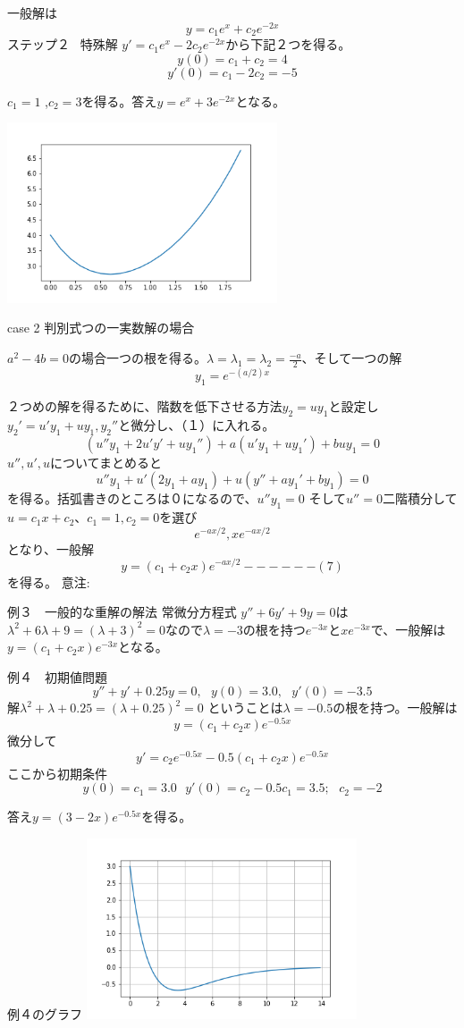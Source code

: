 \documentclass[uplatex]{jsarticle}
\begin{document}
  一般解は
$$ y = c_1{e}^{x} + c_2{e}^{-2x} $$
ステップ２ \ 特殊解 $y'=c_1{e}^{x} -2c_2{e}^{-2x}$から下記２つを得る。
$$ y(0) = c_1 +c_2 = 4$$
$$ y'(0) = c_1 -2c_2 = -5$$

$c_1=1$ ,$c_2=3$を得る。答え$y={e}^{x}+3{e}^{-2x}$となる。


\includegraphics[width=8cm]{../ipython/real.png}

 \LARGE case 2 判別式つの一実数解の場合
 \large

 
 $a^2-4b=0$の場合一つの根を得る。${\lambda}={\lambda_1}={\lambda_2}=\frac{-a}{2}$、そして一つの解
 $$ y_1= {e}^{-(a/2)x}$$

 ２つめの解を得るために、階数を低下させる方法$y_2=uy_1$と設定し$y_2'=u'y_1+uy_1, y_2''$と微分し、（１）に入れる。
 $$(u''y_1+2u'y'+uy_1'')+a(u'y_1+uy_1')+buy_1=0$$
 $u'',u',u$についてまとめると
 $$u''y_1+u'(2y_1+ay_1)+u(y'' + ay_1'+ by_1) =0$$
 を得る。括弧書きのところは０になるので、$u''y_1=0$ そして$u''=0$二階積分して$u= c_1x +c_2$、$c_1=1,c_2=0$を選び
 $${e}^{-ax/2},x{e}^{-ax/2}$$
 となり、一般解
 $$ y= (c_1 +c_2x){e}^{-ax/2}------(7) $$
 を得る。
意注:

例３　一般的な重解の解法
常微分方程式 $y'' +6y'+9y=0$は${\lambda}^2+6{\lambda}+9=({\lambda}+3)^2 =0$なので${\lambda}= -3$の根を持つ${e}^{-3x}とx{e}^{-3x}$で、一般解は$y=(c_1+c_2x){e}^{-3x}$となる。


例４　初期値問題
$$ y'' + y' +0.25y =0, \ \ \ y(0)=3.0, \ \ \ y'(0)=-3.5 $$
解$ {\lambda}^2 + {\lambda}+0.25 = ({\lambda}+0.25)^2=0$ ということは${\lambda}=-0.5$の根を持つ。一般解は
$$ y= (c_1 +c_2x){e}^{-0.5x} $$
微分して
$$ y' = c_2{e}^{-0.5x}-0.5(c_1+c_2x){e}^{-0.5x} $$
ここから初期条件
$$ y(0)= c_1=3.0 \ \ \ y'(0) = c_2 -0.5c_1=3.5; \ \ \ c_2=-2 $$

答え$y=(3-2x){e}^{-0.5x}$を得る。

例４のグラフ
\includegraphics[width=8cm]{../ipython/double.png}
\end{document}

